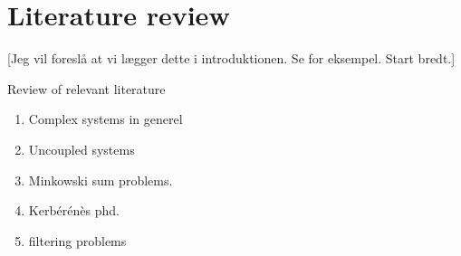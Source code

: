 \section{Literature review}

[Jeg vil foreslå at vi lægger dette i introduktionen. Se \cite{dietz2020introducing} for eksempel. Start bredt.]

Review of relevant literature

\begin{enumerate}
        \item Complex systems in generel
        \item Uncoupled systems
	\item Minkowski sum problems.
	\item Kerbérénès phd.
	\item filtering problems
\end{enumerate}
